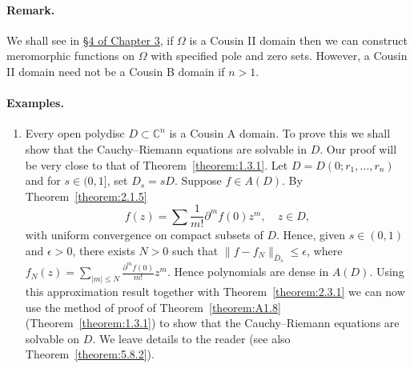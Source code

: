 \paragraph*{Remark.} We shall see in \hyperref[sec:3:4]{\S4 of Chapter 3}, if $\Omega$ is a Cousin II domain then we can construct meromorphic functions on $\Omega$ with specified pole and zero sets. However, a Cousin II domain need not be a Cousin B domain if $n>1$.
\paragraph*{Examples.}
\begin{enumerate}
\item Every open polydisc $D\subset\mathbb C^n$ is a Cousin A domain. To prove this we shall show that the Cauchy--Riemann equations are solvable in $D$. Our proof will be very close to that of Theorem~\ref{theorem:1.3.1}. Let $D=D(0;r_1,\ldots,r_n)$ and for $s\in(0,1]$, set $D_s=sD$. Suppose $f\in A(D)$. By Theorem~\ref{theorem:2.1.5}
\[f(z)=\sum\frac1{m!}\partial^m f(0)z^m,\quad z\in D,\]
with uniform convergence on compact subsets of $D$. Hence, given $s\in(0,1)$ and $\epsilon>0$, there exists $N>0$ such that $\|f-f_N\|_{\bar D_s}\leq\epsilon$, where $f_N(z)=\sum_{|m|\leq N}\frac{\partial^m f(0)}{m!}z^m$. Hence polynomials are dense in $A(D)$. Using this approximation result together with Theorem~\ref{theorem:2.3.1} we can now use the method of proof of Theorem~\ref{theorem:A1.8} (Theorem~\ref{theorem:1.3.1}) to show that the Cauchy--Riemann equations are solvable on $D$. We leave details to the reader (see also Theorem~\ref{theorem:5.8.2}).


\end{enumerate}
